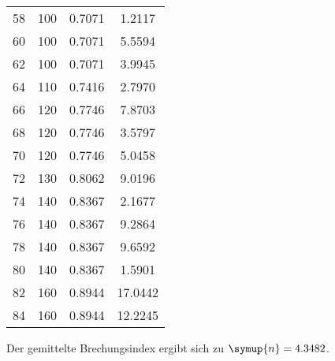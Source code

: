 \begin{table}
\begin{tabular}{c c c c}
      58&100&0.7071&1.2117 \\
      60&100&0.7071&5.5594 \\
      62&100&0.7071&3.9945 \\
      64&110&0.7416&2.7970 \\
      66&120&0.7746&7.8703 \\
      68&120&0.7746&3.5797 \\
      70&120&0.7746&5.0458 \\
      72&130&0.8062&9.0196 \\
      74&140&0.8367&2.1677 \\
      76&140&0.8367&9.2864 \\
      78&140&0.8367&9.6592 \\
      80&140&0.8367&1.5901 \\
     82&160&0.8944&17.0442 \\
     84&160&0.8944&12.2245 \\
        \bottomrule
    \end{tabular}
    \label{tab:Pol0}
\end{table}

Der gemittelte Brechungsindex ergibt sich zu $\symup{n} = 4.3482$.


